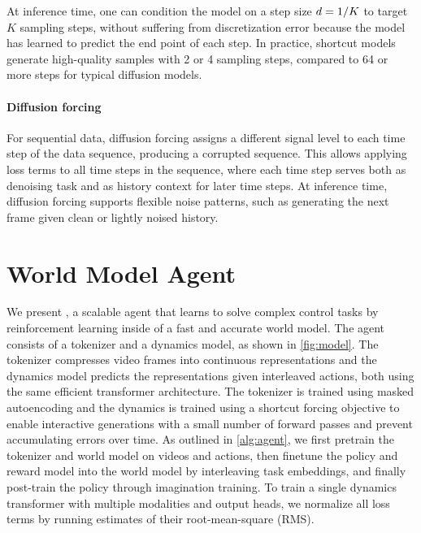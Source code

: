 \documentclass[11pt]{article}
\begin{document}

At inference time, one can condition the model on a step size $d=1/K$ to target $K$ sampling steps, without suffering from discretization error because the model has learned to predict the end point of each step. In practice, shortcut models generate high-quality samples with 2 or 4 sampling steps, compared to 64 or more steps for typical diffusion models.

\paragraph{Diffusion forcing}

For sequential data, diffusion forcing \citep{diffusionforcing} assigns a different signal level to each time step of the data sequence, producing a corrupted sequence.
This allows applying loss terms to all time steps in the sequence, where each time step serves both as denoising task and as history context for later time steps.
At inference time, diffusion forcing supports flexible noise patterns, such as generating the next frame given clean or lightly noised history.

\pagebreak
\section{World Model Agent}


We present \method, a scalable agent that learns to solve complex control tasks by reinforcement learning inside of a fast and accurate world model.
The agent consists of a tokenizer and a dynamics model, as shown in \cref{fig:model}.
The tokenizer compresses video frames into continuous representations and the dynamics model predicts the representations given interleaved actions, both using the same efficient transformer architecture.
The tokenizer is trained using masked autoencoding and the dynamics is trained using a shortcut forcing objective to enable interactive generations with a small number of forward passes and prevent accumulating errors over time.
As outlined in \cref{alg:agent}, we first pretrain the tokenizer and world model on videos and actions, then finetune the policy and reward model into the world model by interleaving task embeddings, and finally post-train the policy through imagination training.
To train a single dynamics transformer with multiple modalities and output heads, we normalize all loss terms by running estimates of their root-mean-square (RMS).
\end{document}
